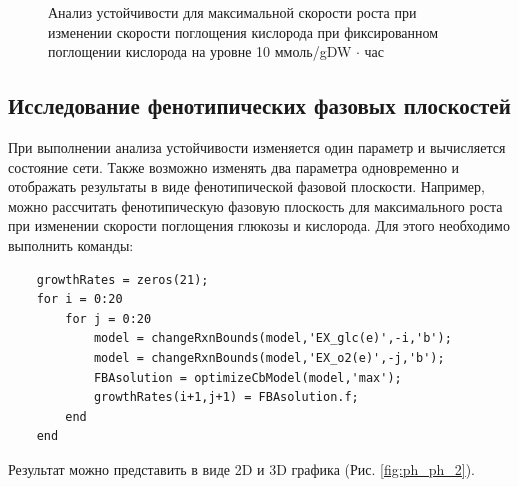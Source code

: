\documentclass[a4paper, 12pt]{article}
\begin{document}
\begin{figure}[H]
    \caption{Анализ устойчивости для максимальной скорости роста при изменении скорости поглощения кислорода при фиксированном поглощении кислорода на уровне 10 ммоль/gDW $\cdot$ час}
    \label{fig:gr_r_2}
\end{figure}

\subsection{Исследование фенотипических фазовых плоскостей}

При выполнении анализа устойчивости изменяется один параметр и вычисляется состояние сети. Также возможно изменять два параметра одновременно и отображать результаты в виде фенотипической фазовой плоскости. Например, можно рассчитать фенотипическую фазовую плоскость для максимального роста при изменении скорости поглощения глюкозы и кислорода. Для этого необходимо выполнить команды:
\begin{lstlisting}
    growthRates = zeros(21);
    for i = 0:20
        for j = 0:20
            model = changeRxnBounds(model,'EX_glc(e)',-i,'b');
            model = changeRxnBounds(model,'EX_o2(e)',-j,'b');
            FBAsolution = optimizeCbModel(model,'max');
            growthRates(i+1,j+1) = FBAsolution.f;
        end
    end
\end{lstlisting}

Результат можно представить в виде 2D и 3D графика (Рис. \ref{fig:ph_ph_2}).
\end{document}
